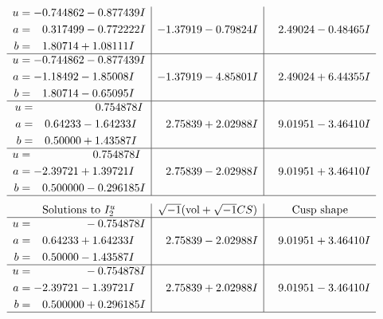 \documentclass[1p]{elsarticle_modified}
\theoremstyle{definition}
\newcommand{\I}{\sqrt{-1}}
\begin{document}
$$\begin{array}{c|c|c}
\begin{aligned}
u &= -0.744862 - 0.877439 I \\
a &= \phantom{-}0.317499 - 0.772222 I \\
b &= \phantom{-}1.80714 + 1.08111 I\end{aligned}
 & -1.37919 - 0.79824 I & \phantom{-}2.49024 - 0.48465 I \\ \hline\begin{aligned}
u &= -0.744862 - 0.877439 I \\
a &= -1.18492 - 1.85008 I \\
b &= \phantom{-}1.80714 - 0.65095 I\end{aligned}
 & -1.37919 - 4.85801 I & \phantom{-}2.49024 + 6.44355 I \\ \hline\begin{aligned}
u &= \phantom{-0.000000 -}0.754878 I \\
a &= \phantom{-}0.64233 - 1.64233 I \\
b &= \phantom{-}0.50000 + 1.43587 I\end{aligned}
 & \phantom{-}2.75839 + 2.02988 I & \phantom{-}9.01951 - 3.46410 I \\ \hline\begin{aligned}
u &= \phantom{-0.000000 -}0.754878 I \\
a &= -2.39721 + 1.39721 I \\
b &= \phantom{-}0.500000 - 0.296185 I\end{aligned}
 & \phantom{-}2.75839 - 2.02988 I & \phantom{-}9.01951 + 3.46410 I\\
 \hline 
 \end{array}$$\newpage$$\begin{array}{c|c|c}  
\text{Solutions to }I^u_{2}& \I (\text{vol} + \sqrt{-1}CS) & \text{Cusp shape}\\
 \hline 
\begin{aligned}
u &= \phantom{-0.000000 } -0.754878 I \\
a &= \phantom{-}0.64233 + 1.64233 I \\
b &= \phantom{-}0.50000 - 1.43587 I\end{aligned}
 & \phantom{-}2.75839 - 2.02988 I & \phantom{-}9.01951 + 3.46410 I \\ \hline\begin{aligned}
u &= \phantom{-0.000000 } -0.754878 I \\
a &= -2.39721 - 1.39721 I \\
b &= \phantom{-}0.500000 + 0.296185 I\end{aligned}
 & \phantom{-}2.75839 + 2.02988 I & \phantom{-}9.01951 - 3.46410 I\\
 \hline 
 \end{array}$$\newpage
\end{document}
